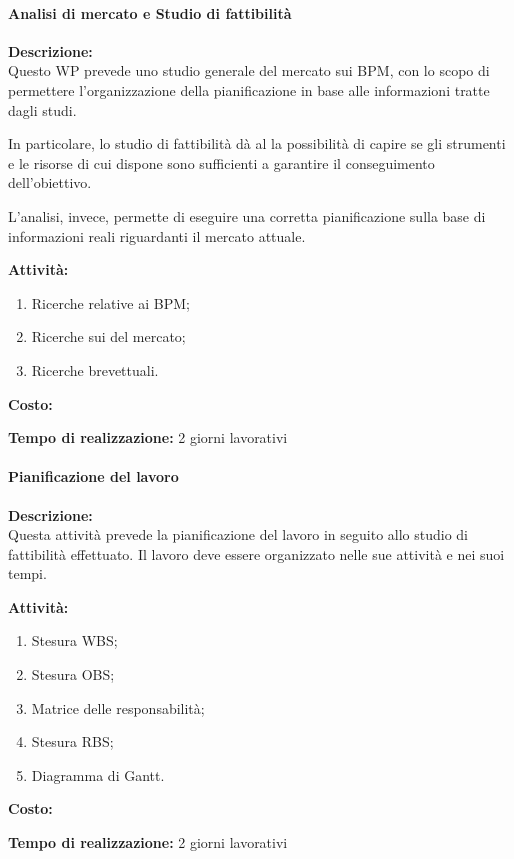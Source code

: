 \paragraph{Analisi di mercato e Studio di fattibilità}
\begin{description}
  \item{\bfseries Descrizione:}\\
Questo WP prevede uno studio generale del mercato sui  BPM, con lo scopo di permettere l'organizzazione della pianificazione in base alle informazioni tratte dagli studi.
		
In particolare, lo studio di fattibilità dà al  la possibilità di capire se gli strumenti e le risorse di cui dispone sono sufficienti a garantire il conseguimento dell'obiettivo.

L'analisi, invece, permette di eseguire una corretta pianificazione sulla base di informazioni reali riguardanti il mercato attuale. 
  \item{\bfseries Attività:}
  \begin{enumerate}
    \item Ricerche relative ai \sw BPM;
    \item Ricerche sui  del mercato;
    \item Ricerche brevettuali.
  \end{enumerate}
  \item  {\bfseries Costo:}
  \item  {\bfseries Tempo di realizzazione:} 2 giorni lavorativi
\end{description}

\paragraph{Pianificazione del lavoro}
\begin{description}
\item{\bfseries Descrizione:}\\
Questa attività prevede la pianificazione del lavoro in seguito allo studio di fattibilità effettuato. Il lavoro deve essere organizzato nelle sue attività e nei suoi tempi.
\item{\bfseries Attività:}
	\begin{enumerate}
		\item Stesura WBS;
		\item Stesura OBS;
		\item Matrice delle responsabilità;
		\item Stesura RBS;
		\item Diagramma di Gantt.
  \end{enumerate}
  \item{\bfseries Costo:}
  \item{\bfseries Tempo di realizzazione:} 2 giorni lavorativi
\end{description}

